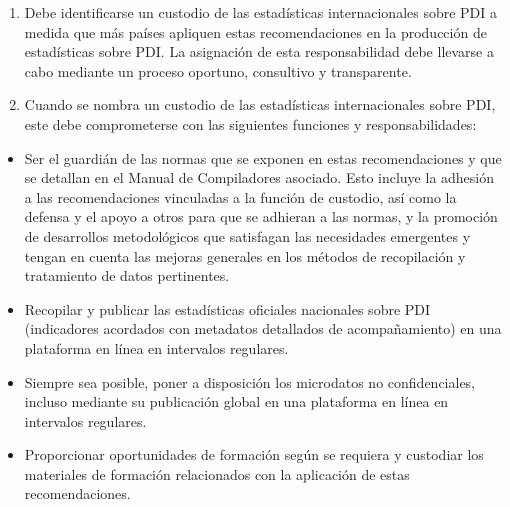 \documentclass[
]{book}
\providecommand{\tightlist}{%
  \setlength{\itemsep}{0pt}\setlength{\parskip}{0pt}}
\begin{document}
\begin{enumerate}
\item
  Debe identificarse un custodio de las estadísticas internacionales sobre PDI a medida que más países apliquen estas recomendaciones en la producción de estadísticas sobre PDI. La asignación de esta responsabilidad debe llevarse a cabo mediante un proceso oportuno, consultivo y transparente.
\item
  Cuando se nombra un custodio de las estadísticas internacionales sobre PDI, este debe comprometerse con las siguientes funciones y responsabilidades:
\end{enumerate}

\begin{itemize}
\tightlist
\item
  Ser el guardián de las normas que se exponen en estas recomendaciones y que se detallan en el Manual de Compiladores asociado. Esto incluye la adhesión a las recomendaciones vinculadas a la función de custodio, así como la defensa y el apoyo a otros para que se adhieran a las normas, y la promoción de desarrollos metodológicos que satisfagan las necesidades emergentes y tengan en cuenta las mejoras generales en los métodos de recopilación y tratamiento de datos pertinentes.
\item
  Recopilar y publicar las estadísticas oficiales nacionales sobre PDI (indicadores acordados con metadatos detallados de acompañamiento) en una plataforma en línea en intervalos regulares.
\item
  Siempre sea posible, poner a disposición los microdatos no confidenciales, incluso mediante su publicación global en una plataforma en línea en intervalos regulares.
\item
  Proporcionar oportunidades de formación según se requiera y custodiar los materiales de formación relacionados con la aplicación de estas recomendaciones.
\end{itemize}
\end{document}
